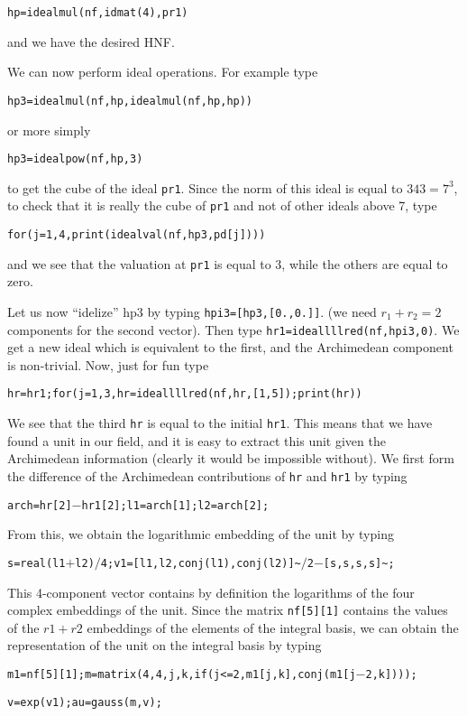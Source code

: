 \centerline{\tt hp=idealmul(nf,idmat(4),pr1)}

and we have the desired HNF. 

We can now perform ideal operations. For example type

\centerline{\tt hp3=idealmul(nf,hp,idealmul(nf,hp,hp))}

or more simply

\centerline{\tt hp3=idealpow(nf,hp,3)}

to get the cube of the ideal {\tt pr1}.
Since the norm of this ideal is equal to $343=7^3$,
to check that it is really the cube of {\tt pr1} and not of other ideals
above 7, type

\centerline{\tt for(j=1,4,print(idealval(nf,hp3,pd[j])))}

and we see that the valuation at {\tt pr1} is equal to 3, while
the others are equal to zero.

Let us now ``idelize'' hp3 by typing {\tt hpi3=[hp3,[0.,0.]]}.
(we need $r_1+r_2=2$ components for the second vector).
Then type {\tt hr1=ideallllred(nf,hpi3,0)}. We get a new ideal which
is equivalent to the first, and the Archimedean component is
non-trivial. Now, just for fun type

\centerline{\tt hr=hr1;for(j=1,3,hr=ideallllred(nf,hr,[1,5]);print(hr))}

We see that the third {\tt hr} is equal to the initial {\tt hr1}. This
means that we have found a unit in our field, and it is easy to
extract this unit given the Archimedean information (clearly it
would be impossible without). We first form the difference of the
Archimedean contributions of {\tt hr} and {\tt hr1} by typing

\centerline{\tt arch=hr[2]$-$hr1[2];l1=arch[1];l2=arch[2];}

From this, we obtain the logarithmic embedding of the unit by typing

\centerline{\tt s=real(l1$+$l2)$/$4;v1=[l1,l2,conj(l1),conj(l2)]\~{}$/$2$-$[s,s,s,s]\~{};}

This 4-component vector contains by definition the logarithms of the
four complex embeddings of the unit. Since the matrix {\tt nf[5][1]}
contains the values of the $r1+r2$ embeddings of the elements of the
integral basis, we can obtain the representation of the unit on the
integral basis by typing

{\tt m1=nf[5][1];m=matrix(4,4,j,k,if(j<=2,m1[j,k],conj(m1[j$-$2,k])));}

{\tt v=exp(v1);au=gauss(m,v);}


